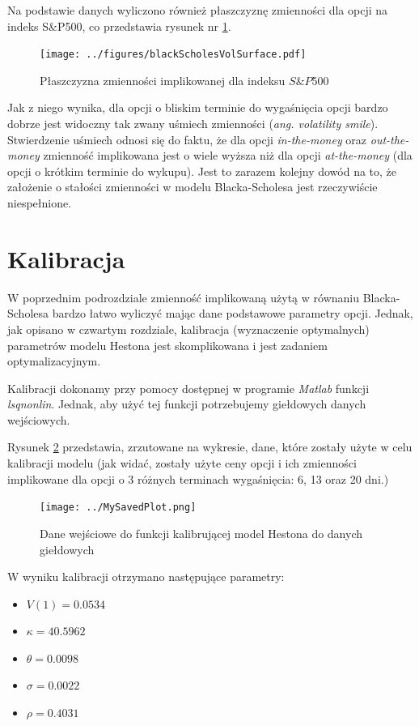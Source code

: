 \documentclass{pracamgr}
\begin{document}
Na podstawie danych wyliczono również płaszczyznę zmienności dla 
opcji na indeks S\&P500, co przedstawia rysunek nr \ref{fig:volatilitySurface}. 

\begin{figure}
  \centering
  \texttt{[image: ../figures/blackScholesVolSurface.pdf]}
  \caption{Płaszczyzna zmienności implikowanej dla indeksu $S\&P$500}
  \label{fig:volatilitySurface}
\end{figure}

Jak z niego wynika, dla opcji o bliskim terminie do wygaśnięcia opcji bardzo dobrze jest widoczny
tak zwany uśmiech zmienności (\textit{ang. volatility smile}). Stwierdzenie uśmiech 
odnosi się do faktu, że dla opcji \textit{in-the-money} oraz \textit{out-the-money}
zmienność implikowana jest o wiele wyższa niż dla opcji \textit{at-the-money} (dla opcji o krótkim
terminie do wykupu).
Jest to zarazem kolejny dowód na to, że założenie o stałości zmienności w modelu Blacka-Scholesa jest rzeczywiście niespełnione.


\section{Kalibracja}

W poprzednim podrozdziale zmienność implikowaną użytą w równaniu Blacka-Scholesa bardzo łatwo 
wyliczyć mając dane podstawowe parametry opcji. Jednak, jak opisano w czwartym rozdziale, 
kalibracja (wyznaczenie optymalnych) parametrów modelu Hestona jest skomplikowana i jest
zadaniem optymalizacyjnym.  

Kalibracji dokonamy przy pomocy dostępnej w programie \textit{Matlab} funkcji \textit{lsqnonlin}.
Jednak, aby użyć tej funkcji potrzebujemy giełdowych danych wejściowych.


Rysunek \ref{fig:calibration} przedstawia, zrzutowane na wykresie, dane, które
zostały użyte w celu kalibracji modelu (jak widać, zostały użyte ceny 
opcji i ich zmienności implikowane dla opcji o 3 różnych terminach wygaśnięcia: 
6, 13 oraz 20 dni.)

\begin{figure}
  \centering
  \texttt{[image: ../MySavedPlot.png]}
  \caption{Dane wejściowe do funkcji kalibrującej model Hestona do danych giełdowych}
  \label{fig:calibration}
\end{figure}

W wyniku kalibracji otrzymano następujące parametry:


\begin{itemize}
  \item $V(1) = 0.0534 $
  \item $\kappa = 40.5962$
  \item $\theta = 0.0098$
  \item $\sigma = 0.0022$
  \item $\rho = 0.4031$
\end{itemize}
\end{document}
